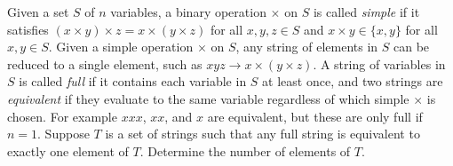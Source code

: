 Given a set $S$ of $n$ variables, a binary operation $\times$ on $S$ is called \emph{simple} if it satisfies $(x \times y) \times z = x \times (y \times z)$ for all $x,y,z \in S$ and $x \times y \in \{x,y\}$ for all $x,y \in S$. Given a simple operation $\times$ on $S$, any string of elements in $S$ can be reduced to a single element, such as $xyz \to x \times (y \times z)$. A string of variables in $S$ is called \emph{full} if it contains each variable in $S$ at least once, and two strings are \emph{equivalent} if they evaluate to the same variable regardless of which simple $\times$ is chosen. For example $xxx$, $xx$, and $x$ are equivalent, but these are only full if $n=1$. Suppose $T$ is a set of strings such that any full string is equivalent to exactly one element of $T$. Determine the number of elements of $T$.